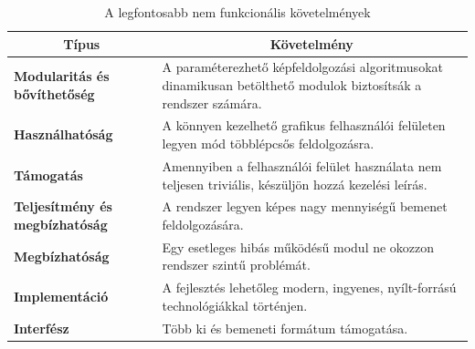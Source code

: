 \documentclass[a4paper,12pt,oneside]{report}
\begin{document}
\begin{table}[h]
\begin{tabular}{p{3cm}|p{10cm}}

\toprule
\multicolumn{1}{c}{\textbf{Típus}} & \multicolumn{1}{c}{\textbf{Követelmény}} \\ \midrule
\textbf{Modularitás és bővíthetőség} & A paraméterezhető képfeldolgozási algoritmusokat dinamikusan betölthető modulok biztosítsák a rendszer számára.\\
\hline
\textbf{Használhatóság} & A könnyen kezelhető grafikus felhasználói felületen legyen mód többlépcsős feldolgozásra. \\
\hline
\textbf{Támogatás} & Amennyiben a felhasználói felület használata nem teljesen triviális, készüljön hozzá kezelési leírás. \\
\hline
\textbf{Teljesítmény és megbízhatóság} & A rendszer legyen képes nagy mennyiségű bemenet feldolgozására. \\
\hline
\textbf{Megbízhatóság} & Egy esetleges hibás működésű modul ne okozzon rendszer szintű problémát. \\
\hline
\textbf{Implementáció} & A fejlesztés lehetőleg modern, ingyenes, nyílt-forrású  technológiákkal történjen. \\ 
\hline
\textbf{Interfész} & Több ki és bemeneti formátum támogatása. \\
\hline
\end{tabular}
\caption{A legfontosabb nem funkcionális követelmények}
\label{table:nonfunct_req_table}
\end{table}
\end{document}
